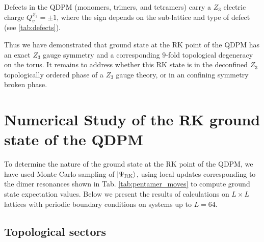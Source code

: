 \documentclass[twocolumn,prb,aps,floatfix,superscriptaddress]{revtex4-1}
\newcommand{\tabref}[1]{Tab. \ref{#1}}
\newcommand{\ket}[1]{| #1 \rangle}
\begin{document}
Defects in the QDPM (monomers, trimers, and tetramers) carry a $Z_3$ electric charge $Q_v^{Z_3} = \pm 1$, where the sign depends on the sub-lattice and type of defect (see \ref{tab:defects}).

Thus we have demonstrated that ground state at the RK point of the QDPM has an exact $Z_3$ gauge symmetry and a corresponding $9$-fold topological degeneracy on the torus. It remains to address whether this RK state is in the deconfined $Z_3$ topologically ordered phase of a $Z_3$ gauge theory, or in an confining symmetry broken phase. 


\section{Numerical Study of the RK ground state of the QDPM}
\label{sec:numerics}

To determine the nature of the ground state at the RK point of the QDPM, we have used Monte Carlo sampling of $\ket{\Psi_{\rm{RK}}}$, using local updates corresponding to the dimer resonances shown in \tabref{tab:pentamer_moves} to compute ground state expectation values. Below we present the results of calculations on $L\times L$ lattices with periodic boundary conditions on systems up to $L=64$. 

\subsection{Topological sectors}
\end{document}
